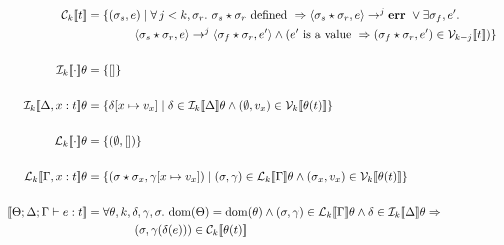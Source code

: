 \begin{align*}
\\
    \C{k}{ t } &= \{ (\sigma_s, e) \mid \forall \, j < k, \sigma_r.\ \sigma_s \star \sigma_r \textrm{ defined } \Rightarrow \langle \sigma_s \star \sigma_r, e \rangle \rightarrow^j \ottkw{err}\ \vee \exists \sigma_f, e'.\\
               & \qquad \qquad \langle \sigma_s \star \sigma_r, e \rangle \rightarrow^j \langle \sigma_f \star \sigma_r, e' \rangle \wedge ( e' \textrm { is a value } \Rightarrow ( \sigma_f \star \sigma_r, e' ) \in \V{k-j}{t} ) \} \\
\\
    \den{I}{k}{ \cdot } \theta &= \{ [] \} \\
\\
    \den{I}{k}{ \Delta, x : t } \theta &= \{ \delta[x \mapsto v_x ] \mid \delta \in \den{I}{k}{\Delta}\theta \wedge (\empH, v_x) \in \V{k}{\theta(t)} \} \\
\\
    \den{L}{k}{ \cdot } \theta &= \{ (\empH, []) \} \\
\\
    \den{L}{k}{ \Gamma, x : t } \theta &= \{ (\sigma \star \sigma_x, \gamma[x \mapsto v_x ]) \mid (\sigma, \gamma) \in \den{L}{k}{\Gamma}\theta \wedge (\sigma_x, v_x) \in \V{k}{\theta(t)} \} \\
\\
\den{}{}{ \Theta; \Delta ; \Gamma \vdash e : t } &= \forall \theta, k, \delta, \gamma, \sigma.\ \dom(\Theta) = \dom(\theta) \wedge (\sigma, \gamma) \in \den{L}{k}{ \Gamma }\theta \wedge \delta \in \den{I}{k}{ \Delta }\theta \Rightarrow \\
                                                 & \qquad \qquad (\sigma, \gamma(\delta(e))) \in \C{k}{ \theta(t) }
\end{align*}
